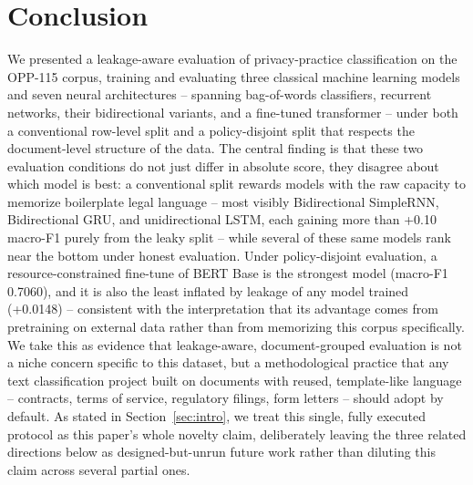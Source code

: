 \documentclass[11pt]{acl}
\begin{document}

\section{Conclusion}
\label{sec:conclusion}

We presented a leakage-aware evaluation of privacy-practice classification on the
OPP-115 corpus, training and evaluating three classical machine learning models and
seven neural architectures -- spanning bag-of-words classifiers, recurrent networks,
their bidirectional variants, and a fine-tuned transformer -- under both a conventional
row-level split and a policy-disjoint split that respects the document-level structure
of the data. The central finding is that these two evaluation conditions do not just
differ in absolute score, they disagree about which model is best: a conventional split
rewards models with the raw capacity to memorize boilerplate legal language -- most
visibly Bidirectional SimpleRNN, Bidirectional GRU, and unidirectional LSTM, each
gaining more than +0.10 macro-F1 purely from the leaky split -- while several of these
same models rank near the bottom under honest evaluation. Under policy-disjoint
evaluation, a resource-constrained fine-tune of BERT Base is the strongest model
(macro-F1 0.7060), and it is also the least inflated by leakage of any model trained
(+0.0148) -- consistent with the interpretation that its advantage comes from
pretraining on external data rather than from memorizing this corpus specifically. We
take this as evidence that leakage-aware, document-grouped evaluation is not a niche
concern specific to this dataset, but a methodological practice that any text
classification project built on documents with reused, template-like language --
contracts, terms of service, regulatory filings, form letters -- should adopt by
default. As stated in Section~\ref{sec:intro}, we treat this single, fully executed
protocol as this paper's whole novelty claim, deliberately leaving the three related
directions below as designed-but-unrun future work rather than diluting this claim
across several partial ones.
\end{document}
